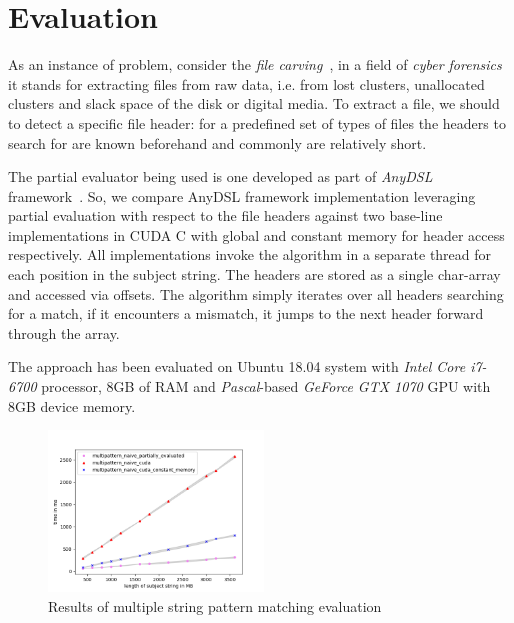 \documentclass[sigplan,review,anonymous]{acmart}\settopmatter{printfolios=true,printccs=false,printacmref=false}
\newcommand\todo[1]{{\color{red}#1}}
\begin{document}




\section{Evaluation}

As an instance of problem, consider the \textit{file carving}~\cite{DataCarving}, in a field of \textit{cyber forensics} it stands for extracting files from raw data, i.e. from lost clusters, unallocated clusters and slack space of the disk or digital media.
To extract a file, we should to detect a specific file header: for a predefined set of types of files the headers to search for are known beforehand and commonly are relatively short.

The partial evaluator being used is one developed as part of \textit{AnyDSL} framework~\cite{LeiBa}.
So, we compare AnyDSL framework implementation leveraging partial evaluation with respect to the file headers against two base-line implementations in CUDA C with global and constant memory for header access respectively. 
All implementations invoke the algorithm in a separate thread for each position in the subject string.
The headers are stored as a single char-array and accessed via offsets.
The algorithm simply iterates over all headers searching for a match, if it encounters a mismatch, it jumps to the next header forward through the array.


The approach has been evaluated on Ubuntu 18.04 system with \textit{Intel Core i7-6700} processor, 8GB of RAM and \textit{Pascal}-based \textit{GeForce GTX 1070} GPU with 8GB device memory.

\begin{figure}[ht]
\centering
    \includegraphics[width=0.51\textwidth]{results_multipattern_final.png}
    \caption{Results of multiple string pattern matching evaluation}
    \label{fig:eval}
\end{figure}
\end{document}
